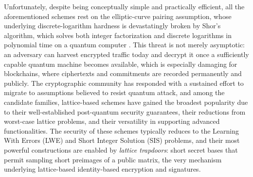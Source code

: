 Unfortunately, despite being conceptually simple and practically efficient, all the aforementioned schemes rest on the elliptic-curve pairing assumption, whose underlying discrete-logarithm hardness is devastatingly broken by Shor’s algorithm, which solves both integer factorization and discrete logarithms in polynomial time on a quantum computer \cite{J:Shor97}. This threat is not merely asymptotic: an adversary can harvest encrypted traffic today and decrypt it once a sufficiently capable quantum machine becomes available, which is especially damaging for blockchains, where ciphertexts and commitments are recorded permanently and publicly. The cryptographic community has responded with a sustained effort to migrate to assumptions believed to resist quantum attack, and among the candidate families, lattice-based schemes have gained the broadest popularity due to their well-established post-quantum security guarantees, their reductions from worst-case lattice problems, and their versatility in supporting advanced functionalities. The security of these schemes typically reduces to the Learning With Errors (LWE) and Short Integer Solution (SIS) problems, and their most powerful constructions are enabled by \emph{lattice trapdoors}: short secret bases that permit sampling short preimages of a public matrix, the very mechanism underlying lattice-based identity-based encryption and signatures.

